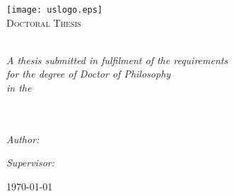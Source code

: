 \pagestyle{empty}
	\begin{center}

		\texttt{[image: uslogo.eps]}\\[2cm]%
		\textsc{\Large Doctoral Thesis}

		\Huge \textbf{\myTitle}\\[3cm] %

		\large \textit{A thesis submitted in fulfilment of the requirements\\ for the degree of Doctor of Philosophy}\\[0.5cm] %
		\textit{in the}\\[0.5cm]
		\myDepartment\\ \myFaculty\\[1cm]
	
		\begin{minipage}{.45\linewidth}
			\begin{flushleft} %
			\emph{Author:}\\
			\href{ \myNameLink }{\myName} %
			\end{flushleft}
		\end{minipage}
		\hfill
		\begin{minipage}{.45\linewidth}
			\begin{flushright} %
			\emph{Supervisor:} \\
			\mySupervisor %
			\end{flushright}
		\end{minipage}

		\vfill
		\large \today
		 
	\end{center}
